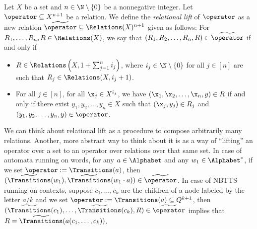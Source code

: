 \begin{definition}\label{def:relationalLift}
  Let $X$ be a set and $n \in \N\setminus\{0\}$ be a nonnegative integer. Let $\operator \subseteq X^{n+1}$ be a relation. We define the \emph{relational lift} of $\operator$ as a new relation $\widetilde{\operator} \subseteq \Relations(X)^{n+1}$ given as follows: For $R_1, \dots, R_n, R \in \Relations(X)$, we say that $(R_1, R_2, \dots, R_n, R) \in \widetilde{\operator}$ if and only if
  \begin{itemize}
    \item $R \in \Relations\left(X, 1+\sum_{j=1}^n i_j\right)$, where $i_j \in \N\setminus\{0\}$ for all $j \in [n]$ are such that $R_j \in \Relations(X, i_j+1)$.
    \item For all $j \in [n]$, for all $\x_j \in X^{i_j}$, we have $(\x_1, \x_2, \dots, \x_n, y) \in R$ if and only if there exist $y_1, y_2, \dots, y_n \in X$ such that $(\x_j, y_j) \in R_j$ and $(y_1, y_2, \dots, y_n, y) \in \operator$.
  \end{itemize}    
\end{definition}

We can think about relational lift as a procedure to compose arbitrarily many relations. Another, more abstract way to think about it is as a way of ``lifting'' an operator over a set to an operator over relations over that same set. In case of automata running on words, for any $a \in \Alphabet$ and any $w_{1} \in \Alphabet^{*}$, if we set $\operator := \Transitions(a)$, then $(\widetilde{\Transitions}(w_{1}), \widetilde{\Transitions}(w_{1}\cdot a)) \in \widetilde{\operator}$. In case of NBTTS running on contexts, suppose $c_{1}, \ldots, c_{k}$ are the children of a node labeled by the letter $a/k$ and we set $\operator := \Transitions(a) \subseteq Q^{k+1}$, then $(\widetilde{\Transitions}(c_{1}), \ldots, \widetilde{\Transitions}(c_{k}), R) \in \widetilde{\operator}$ implies that $R = \widetilde{\Transitions}(a(c_{1}, \ldots, c_{k}))$.


